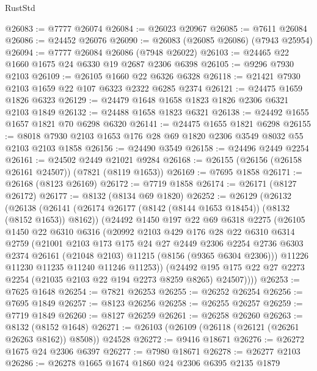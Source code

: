 \begin{lexlean}{RustStd}
\begin{coremodule}
@26083 := @7777 @26074
@26084 := @26023 @20967
@26085 := @7611 @26084
@26086 := @24452 @26076
@26090 := @26083 (@26085 @26086) (@7943 @25954)
@26094 := @7777 @26084 @26086 (@7948 @26022)
@26103 := @24465 @22 @1660 @1675 @24 @6330 @19 @2687 @2306 @6398
@26105 := @9296 @7930 @2103
@26109 := @26105 @1660 @22 @6326 @6328
@26118 := @21421 @7930 @2103 @1659 @22 @107 @6323 @2322 @6285 @2374
@26121 := @24475 @1659 @1826 @6323
@26129 := @24479 @1648 @1658 @1823 @1826 @2306 @6321 @2103 @1849
@26132 := @24488 @1658 @1823 @6321
@26138 := @24492 @1655 @1657 @1821 @70 @6298 @6320
@26141 := @24475 @1655 @1821 @6298
@26155 := @8018 @7930 @2103 @1653 @176 @28 @69 @1820 @2306 @3549 @8032 @55 @2103 @2103 @1858
@26156 := @24490 @3549
@26158 := @24496 @2449 @2254
@26161 := @24502 @2449 @21021 @9284
@26168 := @26155 (@26156 (@26158 @26161 @24507)) (@7821 (@8119 @1653))
@26169 := @7695 @1858
@26171 := @26168 (@8123 @26169)
@26172 := @7719 @1858
@26174 := @26171 (@8127 @26172)
@26177 := @8132 (@8134 @69 @1820)
@26252 := @26129
    (@26132
      (@26138
        (@26141 (@26174 @26177 (@8142 (@8144 @1653 @18454)) (@8132 (@8152 @1653)) @8162))
        (@24492
          @1450
          @197
          @22
          @69
          @6318
          @2275
          (@26105
            @1450
            @22
            @6310
            @6316
            (@20992
              @2103
              @429
              @176
              @28
              @22
              @6310
              @6314
              @2759
              (@21001
                @2103
                @173
                @175
                @24
                @27
                @2449
                @2306
                @2254
                @2736
                @6303
                @2374
                @26161
                (@21048 @2103)
                @11215
                (@8156 (@9365 @6304 @2306)))
              @11226
              @11230
              @11235
              @11240
              @11246
              @11253))
          (@24492 @195 @175 @22 @27 @2273 @2254 (@21035 @2103 @22 @194 @2273 @8259 @8265) @24507))))
@26253 := @7625 @1648
@26254 := @7821 @26253
@26255 := @26252 @26254
@26256 := @7695 @1849
@26257 := @8123 @26256
@26258 := @26255 @26257
@26259 := @7719 @1849
@26260 := @8127 @26259
@26261 := @26258 @26260
@26263 := @8132 (@8152 @1648)
@26271 := @26103 (@26109 (@26118 (@26121 (@26261 @26263 @8162)) @8508)) @24528
@26272 := @9416 @18671
@26276 := @26272 @1675 @24 @2306 @6397
@26277 := @7980 @18671
@26278 := @26277 @2103
@26286 := @26278 @1665 @1674 @1860 @24 @2306 @6395 @2135 @1879

\end{coremodule}
\end{lexlean}

